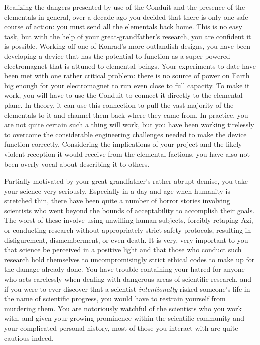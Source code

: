 \documentclass[char]{elementals}
\begin{document}
Realizing the dangers presented by use of the Conduit and the presence of the elementals in general, over a decade ago you decided that there is only one safe course of action: you must send all the elementals back home. This is no easy task, but with the help of your great-grandfather's research, you are confident it is possible. Working off one of Konrad's more outlandish designs, you have been developing a device that has the potential to function as a super-powered electromagnet that is attuned to elemental beings. Your experiments to date have been met with one rather critical problem: there is no source of power on Earth big enough for your electromagnet to run even close to full capacity. To make it work, you will have to use the Conduit to connect it directly to the elemental plane. In theory, it can use this connection to pull the vast majority of the elementals to it and channel them back where they came from. In practice, you are not quite certain such a thing will work, but you have been working tirelessly to overcome the considerable engineering challenges needed to make the device function correctly. Considering the implications of your project and the likely violent reception it would receive from the elemental factions, you have also not been overly vocal about describing it to others.


Partially motivated by your great-grandfather's rather abrupt demise, you take your science very seriously. Especially in a day and age when humanity is stretched thin, there have been quite a number of horror stories involving scientists who went beyond the bounds of acceptability to accomplish their goals. The worst of these involve using unwilling human subjects, forcibly retaping Azi, or conducting research without appropriately strict safety protocols, resulting in disfigurement, dismemberment, or even death. It is very, very important to you that science be perceived in a positive light and that those who conduct such research hold themselves to uncompromisingly strict ethical codes to make up for the damage already done. You have trouble containing your hatred for anyone who acts carelessly when dealing with dangerous areas of scientific research, and if you were to ever discover that a scientist \emph{intentionally} risked someone's life in the name of scientific progress, you would have to restrain yourself from murdering them. You are notoriously watchful of the scientists who you work with, and given your growing prominence within the scientific community and your complicated personal history, most of those you interact with are quite cautious indeed.
\end{document}
